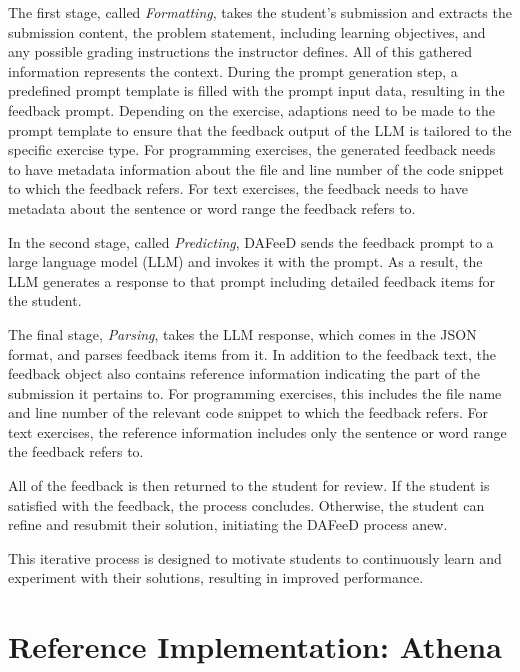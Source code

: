 \documentclass[manuscript,screen,review]{acmart}
\begin{document}
The first stage, called \textit{Formatting}, takes the student's submission and extracts the submission content, the problem statement, including learning objectives, and any possible grading instructions the instructor defines.
All of this gathered information represents the context.
During the prompt generation step, a predefined prompt template is filled with the prompt input data, resulting in the feedback prompt.
Depending on the exercise, adaptions need to be made to the prompt template to ensure that the feedback output of the LLM is tailored to the specific exercise type.
For programming exercises, the generated feedback needs to have metadata information about the file and line number of the code snippet to which the feedback refers.
For text exercises, the feedback needs to have metadata about the sentence or word range the feedback refers to.

In the second stage, called \textit{Predicting}, DAFeeD sends the feedback prompt to a large language model (LLM) and invokes it with the prompt. 
As a result, the LLM generates a response to that prompt including detailed feedback items for the student.

The final stage, \textit{Parsing}, takes the LLM response, which comes in the JSON format, and parses feedback items from it. 
In addition to the feedback text, the feedback object also contains reference information indicating the part of the submission it pertains to.
For programming exercises, this includes the file name and line number of the relevant code snippet to which the feedback refers.
For text exercises, the reference information includes only the sentence or word range the feedback refers to.

All of the feedback is then returned to the student for review.
If the student is satisfied with the feedback, the process concludes. 
Otherwise, the student can refine and resubmit their solution, initiating the DAFeeD process anew.

This iterative process is designed to motivate students to continuously learn and experiment with their solutions, resulting in improved performance.


\section{Reference Implementation: Athena} %
\label{sec:reference-implementation}
\end{document}
